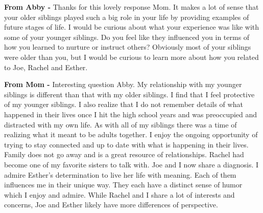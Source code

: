 \textbf{From Abby -} Thanks for this lovely response Mom.
It makes a lot of sense that your older siblings played such a big role in your life by providing examples of future stages of life.
I would be curious about what your experience was like with some of your younger siblings.
Do you feel like they influenced you in terms of how you learned to nurture or instruct others? Obviously most of your siblings were older than you, but I would be curious to learn more about how you related to Joe, Rachel and Esther.

\textbf{From Mom -} Interesting question Abby.
My relationship with my younger siblings is different than that with my older siblings.
I find that I feel protective of my younger siblings.
I also realize that I do not remember details of what happened in their lives once I hit the high school years and was preoccupied and distracted with my own life.
As with all of my siblings there was a time of realizing what it meant to be adults together.
I enjoy the ongoing opportunity of trying to stay connected and up to date with what is happening in their lives.
Family does not go away and is a great resource of relationships.
Rachel had become one of my favorite sisters to talk with.
Joe and I now share a diagnosis.
I admire Esther's determination to live her life with meaning.
Each of them influences me in their unique way.
They each have a distinct sense of humor which I enjoy and admire.
While Rachel and I share a lot of interests and concerns, Joe and Esther likely have more differences of perspective.

